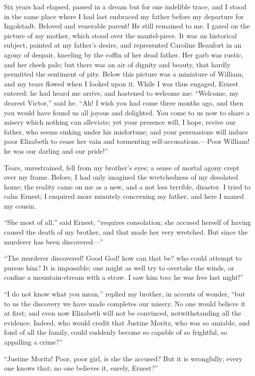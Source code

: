 \documentclass[12pt,openright]{book}
\begin{document}
Six years had elapsed, passed in a dream but for one indelible trace, and I stood in the same place where I had last embraced my father before my departure for Ingolstadt. Beloved and venerable parent! He still remained to me. I gazed on the picture of my mother, which stood over the mantel-piece. It was an historical subject, painted at my father’s desire, and represented Caroline Beaufort in an agony of despair, kneeling by the coffin of her dead father. Her garb was rustic, and her cheek pale; but there was an air of dignity and beauty, that hardly permitted the sentiment of pity. Below this picture was a miniature of William; and my tears flowed when I looked upon it. While I was thus engaged, Ernest entered: he had heard me arrive, and hastened to welcome me: “Welcome, my dearest Victor,” said he. “Ah! I wish you had come three months ago, and then you would have found us all joyous and delighted. You come to us now to share a misery which nothing can alleviate; yet your presence will, I hope, revive our father, who seems sinking under his misfortune; and your persuasions will induce poor Elizabeth to cease her vain and tormenting self-accusations.—Poor William! he was our darling and our pride!”

Tears, unrestrained, fell from my brother’s eyes; a sense of mortal agony crept over my frame. Before, I had only imagined the wretchedness of my desolated home; the reality came on me as a new, and a not less terrible, disaster. I tried to calm Ernest; I enquired more minutely concerning my father, and here I named my cousin.

“She most of all,” said Ernest, “requires consolation; she accused herself of having caused the death of my brother, and that made her very wretched. But since the murderer has been discovered—”

“The murderer discovered! Good God! how can that be? who could attempt to pursue him? It is impossible; one might as well try to overtake the winds, or confine a mountain-stream with a straw. I saw him too; he was free last night!”

“I do not know what you mean,” replied my brother, in accents of wonder, “but to us the discovery we have made completes our misery. No one would believe it at first; and even now Elizabeth will not be convinced, notwithstanding all the evidence. Indeed, who would credit that Justine Moritz, who was so amiable, and fond of all the family, could suddenly become so capable of so frightful, so appalling a crime?”

“Justine Moritz! Poor, poor girl, is she the accused? But it is wrongfully; every one knows that; no one believes it, surely, Ernest?”
\end{document}
